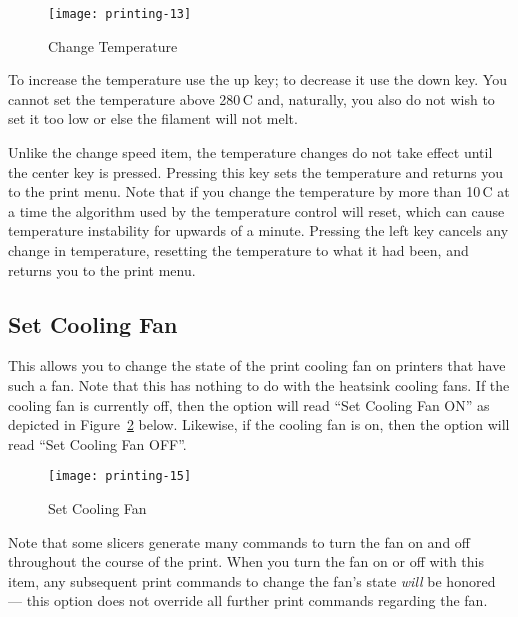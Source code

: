 \begin{figure}[!htbp]
  \centering
    \texttt{[image: printing-13]}
    \caption{Change Temperature}
  \label{fig:printtemp}
\end{figure}

To increase the temperature use the up key; to decrease it use the down key.  You cannot set the temperature above 280\textdegree\,C and, naturally, you also do not wish to set it too low or else the filament will not melt.

Unlike the change speed item, the temperature changes do not take effect until the center key is pressed.  Pressing this key sets the temperature and returns you to the print menu.  Note that if you change the temperature by more than 10\textdegree\,C at a time the algorithm used by the temperature control will reset, which can cause temperature instability for upwards of a minute.  Pressing the left key cancels any change in temperature, resetting the temperature to what it had been, and returns you to the print menu.


\subsection{Set Cooling Fan}\label{sec:cooling}

This allows you to change the state of the \gls{print cooling fan} on printers that have such a fan.  Note that this has nothing to do with the \glspl{heatsink cooling fan}.  If the cooling fan is currently off, then the option will read ``Set Cooling Fan ON'' as depicted in Figure~\ref{fig:coolingfan} below.  Likewise, if the cooling fan is on, then the option will read ``Set Cooling Fan OFF''.

\begin{figure}[!htbp]
  \centering
    \texttt{[image: printing-15]}
    \caption{Set Cooling Fan}
  \label{fig:coolingfan}
\end{figure}

Note that some \glspl{slicer} generate many commands to turn the fan on and off throughout the course of the print.  When you turn the fan on or off with this item, any subsequent print commands to change the fan's state \emph{will} be honored --- this option does not override all further print commands regarding the fan.


